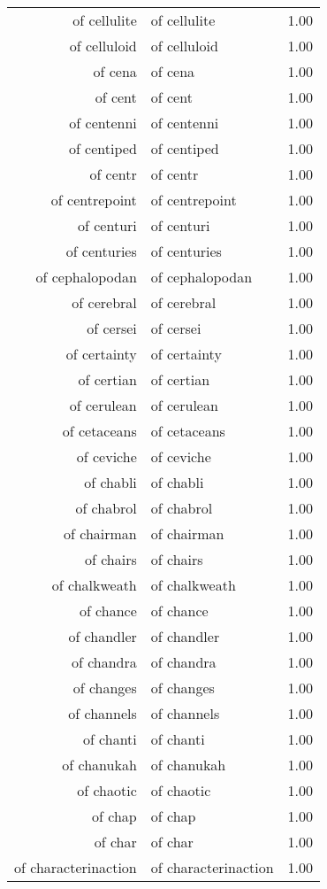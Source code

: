 \begin{table}[ht]
\begin{tabular}{rlr}
  of cellulite & of cellulite & 1.00 \\ 
  of celluloid & of celluloid & 1.00 \\ 
  of cena & of cena & 1.00 \\ 
  of cent & of cent & 1.00 \\ 
  of centenni & of centenni & 1.00 \\ 
  of centiped & of centiped & 1.00 \\ 
  of centr & of centr & 1.00 \\ 
  of centrepoint & of centrepoint & 1.00 \\ 
  of centuri & of centuri & 1.00 \\ 
  of centuries & of centuries & 1.00 \\ 
  of cephalopodan & of cephalopodan & 1.00 \\ 
  of cerebral & of cerebral & 1.00 \\ 
  of cersei & of cersei & 1.00 \\ 
  of certainty & of certainty & 1.00 \\ 
  of certian & of certian & 1.00 \\ 
  of cerulean & of cerulean & 1.00 \\ 
  of cetaceans & of cetaceans & 1.00 \\ 
  of ceviche & of ceviche & 1.00 \\ 
  of chabli & of chabli & 1.00 \\ 
  of chabrol & of chabrol & 1.00 \\ 
  of chairman & of chairman & 1.00 \\ 
  of chairs & of chairs & 1.00 \\ 
  of chalkweath & of chalkweath & 1.00 \\ 
  of chance & of chance & 1.00 \\ 
  of chandler & of chandler & 1.00 \\ 
  of chandra & of chandra & 1.00 \\ 
  of changes & of changes & 1.00 \\ 
  of channels & of channels & 1.00 \\ 
  of chanti & of chanti & 1.00 \\ 
  of chanukah & of chanukah & 1.00 \\ 
  of chaotic & of chaotic & 1.00 \\ 
  of chap & of chap & 1.00 \\ 
  of char & of char & 1.00 \\ 
  of characterinaction & of characterinaction & 1.00 \\ 

\end{tabular}
\end{table}
